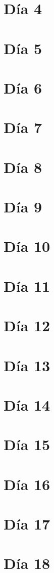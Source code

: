 \documentclass[11pt]{report}
\theoremstyle{plain}
\theoremstyle{definition}
\begin{document}
\section{Día 4}
\section{Día 5}
\section{Día 6}
\section{Día 7}
\section{Día 8}
\section{Día 9}
\section{Día 10}
\section{Día 11}
\section{Día 12}
\section{Día 13}
\section{Día 14}
\section{Día 15}
\section{Día 16}
\section{Día 17}
\section{Día 18}
\end{document}
